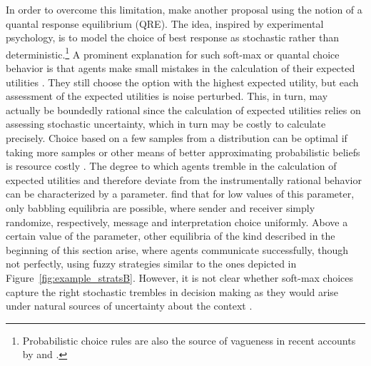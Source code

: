 \documentclass[a4paper]{article}
\begin{document}
In order to overcome this limitation, \citeauthor{franke_vagueness_2011} make another proposal using the notion of a quantal response equilibrium (QRE).
The idea, inspired by experimental psychology, is to model the choice of best response as stochastic rather than deterministic.\footnote{Probabilistic choice rules are also the source of vagueness in recent accounts by \textcite{LassiterGoodman2015:Adjectival-vagu} and \textcite{QingFranke2014:Gradable-Adject}.} 
A prominent explanation for such soft-max or quantal choice behavior is that agents make small mistakes in the calculation of their expected utilities \parencite{Train2009:Discrete-Choice}. 
They still choose the option with the highest expected utility, but each assessment of the expected utilities is noise perturbed.
This, in turn, may actually be boundedly rational since the calculation of expected utilities relies on assessing stochastic uncertainty, which in turn may be costly to calculate precisely. 
Choice based on a few samples from a distribution can be optimal if taking more samples or other means of better approximating probabilistic beliefs is resource costly \parencite[\emph{e.g.}][]{VulGoodman2014:One-and-Done-Op,SanbornChater2016:Bayesian-Brains}.
The degree to which agents tremble in the calculation of expected utilities and therefore deviate from the instrumentally rational behavior can be characterized by a parameter.
\citeauthor{franke_vagueness_2011} find that for low values of this parameter, only babbling equilibria are possible, where sender and receiver simply randomize, respectively, message and interpretation choice uniformly.
Above a certain value of the parameter, other equilibria of the kind described in the beginning of this section arise, where agents communicate successfully, though not perfectly, using fuzzy strategies similar to the ones depicted in Figure~\ref{fig:example_stratsB}. However, it is not clear whether soft-max choices capture the right stochastic trembles in decision making as they would arise under natural sources of uncertainty about the context \parencite[see][]{franke_vagueness_2017}.
\end{document}
